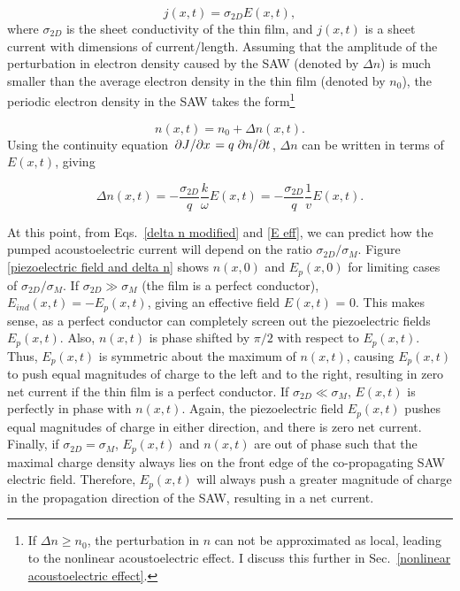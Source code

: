 \documentclass{beavtex_dub_edit}
\begin{document}
\begin{equation}
    j(x,t) = \sigma_{2D} E(x,t), \label{2D AE ohm's law}
\end{equation}
where $\sigma_{2D}$ is the sheet conductivity of the thin film, and $j(x,t)$ is a sheet current with dimensions of current/length. Assuming that the amplitude of the perturbation in electron density caused by the SAW (denoted by $\Delta n$) is much smaller than the average electron density in the thin film (denoted by $n_0$), the periodic electron density in the SAW takes the form\footnote{If $\Delta n \geq n_0$, the perturbation in $n$ can not be approximated as local, leading to the nonlinear acoustoelectric effect. I discuss this further in Sec.\ \ref{nonlinear acoustoelectric effect}.}

\begin{equation}
    n(x,t) = n_0 + \Delta n(x,t). 
\end{equation}
Using the continuity equation $\pdv*{J}{x} = q \pdv*{n}{t}$, $\Delta n$ can be written in terms of $E(x,t)$, giving

\begin{equation}
    \Delta n(x,t) = -\frac{\sigma_{2D}}{q} \frac{k}{\omega} E(x,t) = -\frac{\sigma_{2D}}{q} \frac{1}{v}E(x,t). \label{delta n modified}
\end{equation}

At this point, from Eqs.\ \ref{delta n modified} and \ref{E eff}, we can predict how the pumped acoustoelectric current will depend on the ratio $\sigma_{2D}/\sigma_M$. Figure \ref{piezoelectric field and delta n} shows $n(x,0)$ and $E_p(x,0)$ for limiting cases of $\sigma_{2D}/\sigma_M$. If $\sigma_{2D} \gg \sigma_M$ (the film is a perfect conductor), $E_{ind}(x,t) = -E_p(x,t)$, giving an effective field $E(x,t)$ = 0. This makes sense, as a perfect conductor can completely screen out the piezoelectric fields $E_p(x,t)$. Also, $n(x,t)$ is phase shifted by $\pi/2$ with respect to $E_p(x,t)$. Thus, $E_p(x,t)$ is symmetric about the maximum of $n(x,t)$, causing $E_p(x,t)$ to push equal magnitudes of charge to the left and to the right, resulting in zero net current if the thin film is a perfect conductor. If $\sigma_{2D} \ll \sigma_M$, $E(x,t)$ is perfectly in phase with $n(x,t)$. Again, the piezoelectric field $E_p(x,t)$ pushes equal magnitudes of charge in either direction, and there is zero net current. Finally, if $\sigma_{2D} = \sigma_M$, $E_p(x,t)$ and $n(x,t)$ are out of phase such that the maximal charge density always lies on the front edge of the co-propagating SAW electric field. Therefore, $E_p(x,t)$ will always push a greater magnitude of charge in the propagation direction of the SAW, resulting in a net current.
\end{document}
